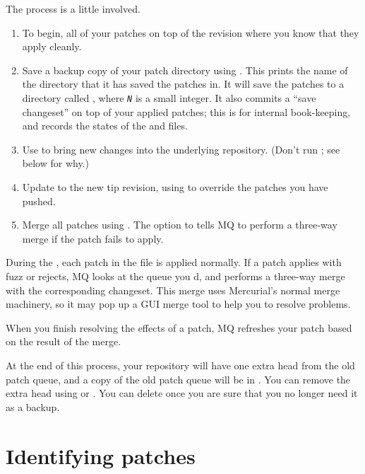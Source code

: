 The process is a little involved.
\begin{enumerate}
\item To begin,  all of your patches on top of
  the revision where you know that they apply cleanly.
\item Save a backup copy of your patch directory using
  .  This prints
  the name of the directory that it has saved the patches in.  It will
  save the patches to a directory called
  , where \texttt{\emph{N}} is a small
  integer.  It also commits a ``save changeset'' on top of your
  applied patches; this is for internal book-keeping, and records the
  states of the  and  files.
\item Use  to bring new changes into the underlying
  repository.  (Don't run ; see below for why.)
\item Update to the new tip revision, using
   to override the patches you
  have pushed.
\item Merge all patches using .  The  option to 
  tells MQ to perform a three-way merge if the patch fails to apply.
\end{enumerate}

During the , each patch in the
 file is applied normally.  If a patch applies with
fuzz or rejects, MQ looks at the queue you d, and
performs a three-way merge with the corresponding changeset.  This
merge uses Mercurial's normal merge machinery, so it may pop up a GUI
merge tool to help you to resolve problems.

When you finish resolving the effects of a patch, MQ refreshes your
patch based on the result of the merge.

At the end of this process, your repository will have one extra head
from the old patch queue, and a copy of the old patch queue will be in
. You can remove the extra head using
or .  You can delete  once
you are sure that you no longer need it as a backup.

\section{Identifying patches}

